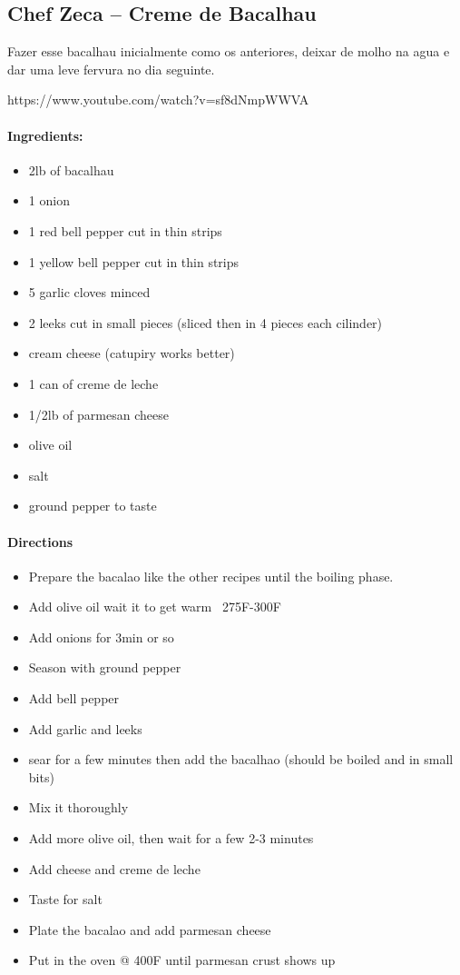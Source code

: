 \documentclass{article}
\begin{document}
\subsection{Chef Zeca – Creme de Bacalhau}

Fazer esse bacalhau inicialmente como os anteriores, deixar de molho na agua e dar uma leve fervura no dia seguinte.

https://www.youtube.com/watch?v=sf8dNmpWWVA

\paragraph{Ingredients:}

\begin{itemize}
	\item 2lb of bacalhau
	\item 1 onion
	\item 1 red bell pepper cut in thin strips
	\item 1 yellow bell pepper cut in thin strips
	\item 5 garlic cloves minced
	\item 2 leeks cut in small pieces (sliced then in 4 pieces each cilinder)
	\item cream cheese (catupiry works better)
	\item 1 can of creme de leche
	\item 1/2lb of parmesan cheese
	\item olive oil
	\item salt
	\item ground pepper to taste
\end{itemize}

\paragraph{Directions}
\begin{itemize}
	\item Prepare the bacalao like the other recipes until the boiling phase.
	\item Add olive oil wait it to get warm ~275F-300F
	\item Add onions for 3min or so
	\item Season with ground pepper
	\item Add bell pepper
	\item Add garlic and leeks
	\item sear for a few minutes then add the bacalhao (should be boiled and in small bits)
	\item Mix it thoroughly
	\item Add more olive oil, then wait for a few 2-3 minutes
	\item Add cheese and creme de leche
	\item Taste for salt
	\item Plate the bacalao and add parmesan cheese
	\item Put in the oven @ 400F until parmesan crust shows up
\end{itemize}
\end{document}

